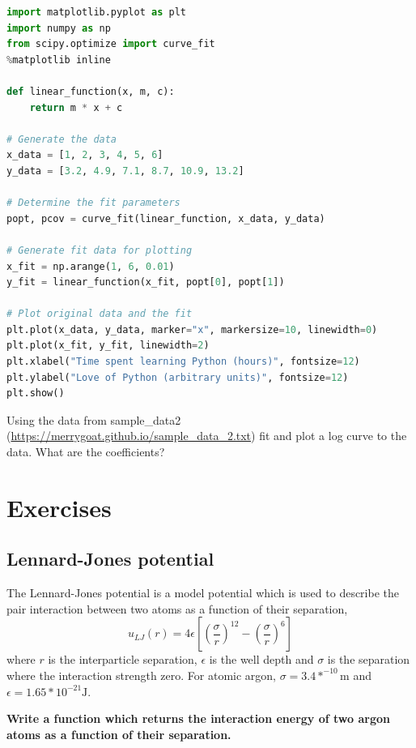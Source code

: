 \begin{lstlisting}[language=Python]
import matplotlib.pyplot as plt
import numpy as np
from scipy.optimize import curve_fit
%matplotlib inline

def linear_function(x, m, c):
    return m * x + c

# Generate the data
x_data = [1, 2, 3, 4, 5, 6]
y_data = [3.2, 4.9, 7.1, 8.7, 10.9, 13.2]

# Determine the fit parameters
popt, pcov = curve_fit(linear_function, x_data, y_data)

# Generate fit data for plotting
x_fit = np.arange(1, 6, 0.01)
y_fit = linear_function(x_fit, popt[0], popt[1])

# Plot original data and the fit
plt.plot(x_data, y_data, marker="x", markersize=10, linewidth=0)
plt.plot(x_fit, y_fit, linewidth=2)
plt.xlabel("Time spent learning Python (hours)", fontsize=12)
plt.ylabel("Love of Python (arbitrary units)", fontsize=12)
plt.show()
\end{lstlisting}
\begin{task}Using the data from sample\_data2 (\url{https://merrygoat.github.io/sample_data_2.txt}) fit and plot a log curve to the data. What are the coefficients?\end{task}

\section{Exercises}
	\subsection{Lennard-Jones potential}\label{LJ_excercise}
		The Lennard-Jones potential is a model potential which is used to describe the pair interaction between two atoms as a function of their separation,
\begin{equation}u_{LJ}(r) = 4\epsilon \left [ \left (\frac{\sigma}{r} \right )^{12}- \left (\frac{\sigma}{r} \right )^{6} \right ]\end{equation}
	where $r$ is the interparticle separation, $\epsilon$ is the well depth and $\sigma$ is the separation where the interaction strength zero. For atomic argon, $\sigma = 3.4*^{-10} \mathrm{m}$ and $\epsilon= 1.65*10^{-21} \mathrm{J}$.
	
\textbf{Write a function which returns the interaction energy of two argon atoms as a function of their separation.}

